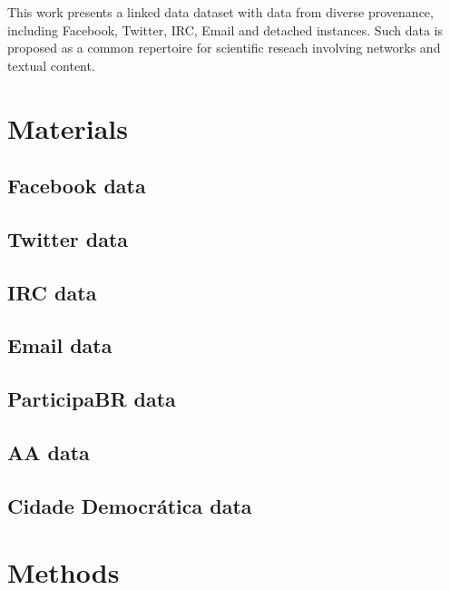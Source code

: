 \documentclass[review]{elsarticle}
\begin{document}
This work presents a linked data dataset with data from diverse
provenance, including Facebook, Twitter, IRC, Email and detached
instances.
Such data is proposed as a common repertoire for scientific
reseach involving networks and textual content.


\section{Materials}\label{materials}
\subsection{Facebook data}
\subsection{Twitter data}
\subsection{IRC data}
\subsection{Email data}
\subsection{ParticipaBR data}
\subsection{AA data}
\subsection{Cidade Democr\'atica data}

\section{Methods}
\end{document}
